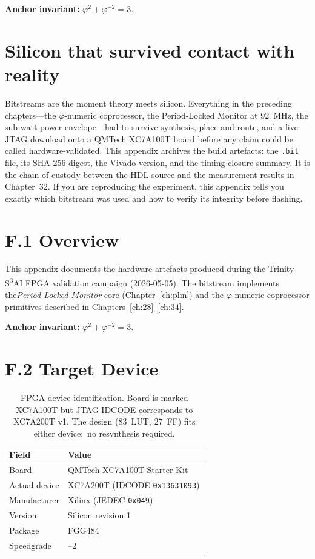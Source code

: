 \textbf{Anchor invariant:} \(\varphi^2 + \varphi^{-2} = 3\).

\section*{Silicon that survived contact with reality}
\label{sec:appF-silicon}

Bitstreams are the moment theory meets silicon. Everything in the preceding
chapters---the \(\varphi\)-numeric coprocessor, the Period-Locked Monitor at
92~MHz, the sub-watt power envelope---had to survive synthesis, place-and-route,
and a live JTAG download onto a QMTech XC7A100T board before any claim could
be called hardware-validated. This appendix archives the build artefacts:
the \texttt{.bit} file, its SHA-256 digest, the Vivado version, and the
timing-closure summary. It is the chain of custody between the HDL source
and the measurement results in Chapter~32. If you are reproducing the
experiment, this appendix tells you exactly which bitstream was used and how
to verify its integrity before flashing.

\section*{F.1 Overview}
\label{sec:appF-overview}

This appendix documents the hardware artefacts produced during the Trinity S\textsuperscript{3}AI
FPGA validation campaign (2026-05-05). The bitstream implements the\emph{Period-Locked Monitor}
core (Chapter~\ref{ch:plm}) and the $\varphi$-numeric coprocessor primitives described in
Chapters~\ref{ch:28}--\ref{ch:34}.

\textbf{Anchor invariant:} \(\varphi^2 + \varphi^{-2} = 3\).

\section*{F.2 Target Device}
\label{sec:appF-target}

\begin{table}[h]
\centering
\begin{tabular}{ll}
\toprule
\textbf{Field} & \textbf{Value} \\
\midrule
Board & QMTech XC7A100T Starter Kit \\
Actual device & XC7A200T (IDCODE \texttt{0x13631093}) \\
Manufacturer & Xilinx (JEDEC \texttt{0x049}) \\
Version & Silicon revision 1 \\
Package & FGG484 \\
Speedgrade & --2 \\
\bottomrule
\end{tabular}
\caption{FPGA device identification. Board is marked XC7A100T but JTAG IDCODE
corresponds to XC7A200T v1. The design (83~LUT, 27~FF) fits either device;\, no
resynthesis required.}
\end{table}

